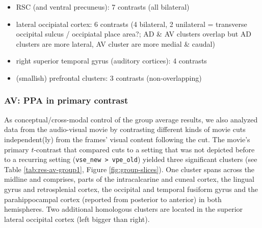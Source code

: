 \documentclass[english]{article}
\begin{document}
\begin{itemize}
\item RSC (and ventral precuneus): 7 contrasts (all bilateral)
\item lateral occipiatal cortex: 6 contrasts (4 bilateral, 2 unilateral =
    transverse occipital sulcus / occipiatal place area?; AD \& AV clusters
    overlap but AD clusters are more lateral, AV cluster are more medial \&
    caudal)
\item right superior temporal gyrus (auditory cortices): 4 contrasts
\item (smallish) prefrontal clusters: 3 contrasts (non-overlapping)
\end{itemize}

\subsubsection{AV: PPA in primary contrast}
As conceptual/cross-modal control of the group average results, we also analyzed
data from the audio-visual movie by contrasting different kinds of movie cuts
independent(ly) from the frames' visual content following the cut.
The movie's primary $t$-contrast that compared cuts to a setting that was not
depicted before to a recurring setting (\texttt{vse\_new > vpe\_old}) yielded
three significant clusters (see Table \ref{tab:res-av-group1}, Figure
\ref{fig:group-slices}).
One cluster spans across the midline and comprises, parts of the intracalcarine
and cuneal cortex, the lingual gyrus and retrosplenial cortex, the occipital and
temporal fusiform gyrus and the parahippocampal cortex (reported from posterior
to anterior) in both hemispheres.
Two additional homologous clusters are located in the superior lateral occipital
cortex (left bigger than right).
\end{document}
